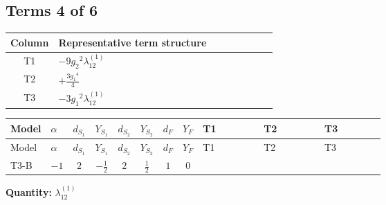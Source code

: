 \documentclass[8pt]{article}
\begin{document}
\begin{landscape}
\subsection*{Terms 4 of 6}
\begin{center}
\begin{tabular}{@{}c >{\raggedright\arraybackslash}p{0.82\linewidth}@{}}
\toprule
Column & Representative term structure \\
\midrule
T1 & \(\displaystyle -9 {g_2}^2 {\lambda_{12}^{(1)}}\) \\
\midrule
T2 & \(\displaystyle +\frac{3 {g_1}^4}{4}\) \\
\midrule
T3 & \(\displaystyle -3 {g_1}^2 {\lambda_{12}^{(1)}}\) \\
\midrule
\bottomrule
\end{tabular}
\end{center}
\smallskip
\tiny
\begin{longtable}{@{}llcccccc >{\raggedright\arraybackslash}p{0.21\linewidth} >{\raggedright\arraybackslash}p{0.21\linewidth} >{\raggedright\arraybackslash}p{0.21\linewidth}@{}}
\toprule
Model & $\alpha$ & $d_{S_1}$ & $Y_{S_1}$ & $d_{S_2}$ & $Y_{S_2}$ & $d_F$ & $Y_F$ & T1 & T2 & T3 \\
\midrule
\endfirsthead
\toprule
Model & $\alpha$ & $d_{S_1}$ & $Y_{S_1}$ & $d_{S_2}$ & $Y_{S_2}$ & $d_F$ & $Y_F$ & T1 & T2 & T3 \\
\midrule
\endhead
T3-B & $-1$ & $2$ & $-\frac{1}{2}$ & $2$ & $\frac{1}{2}$ & $1$ & $0$ & \scriptsize\adjustbox{max width=\linewidth}{$\begin{gathered} -9 {g_2}^2 {\lambda_{12}^{(1)}}\end{gathered}$} & \scriptsize\adjustbox{max width=\linewidth}{$\begin{gathered} +\frac{3 {g_1}^4}{4}\end{gathered}$} & \scriptsize\adjustbox{max width=\linewidth}{$\begin{gathered} -3 {g_1}^2 {\lambda_{12}^{(1)}}\end{gathered}$} \\
\midrule
\bottomrule
\end{longtable}
\clearpage
\noindent\textbf{Quantity: }$\lambda_{12}^{(1)}$\par\smallskip

\end{landscape}
\end{document}
